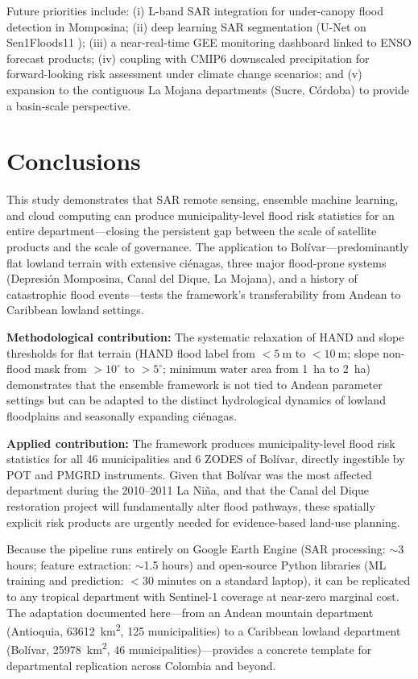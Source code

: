 \documentclass{article}
\begin{document}
Future priorities include: (i) L-band SAR integration for under-canopy flood detection in Momposina; (ii) deep learning SAR segmentation (U-Net on Sen1Floods11 \citep{Bonafilia2020}); (iii) a near-real-time GEE monitoring dashboard linked to ENSO forecast products; (iv) coupling with CMIP6 downscaled precipitation for forward-looking risk assessment under climate change scenarios; and (v) expansion to the contiguous La Mojana departments (Sucre, C\'ordoba) to provide a basin-scale perspective.

\section{Conclusions}
\label{sec:conclusions}

This study demonstrates that SAR remote sensing, ensemble machine learning, and cloud computing can produce municipality-level flood risk statistics for an entire department---closing the persistent gap between the scale of satellite products and the scale of governance. The application to Bol\'ivar---predominantly flat lowland terrain with extensive ci\'enagas, three major flood-prone systems (Depresi\'on Momposina, Canal del Dique, La Mojana), and a history of catastrophic flood events---tests the framework's transferability from Andean to Caribbean lowland settings.

\textbf{Methodological contribution:} The systematic relaxation of HAND and slope thresholds for flat terrain (HAND flood label from $< \SI{5}{\metre}$ to $< \SI{10}{\metre}$; slope non-flood mask from $> 10^{\circ}$ to $> 5^{\circ}$; minimum water area from \SI{1}{\hectare} to \SI{2}{\hectare}) demonstrates that the ensemble framework is not tied to Andean parameter settings but can be adapted to the distinct hydrological dynamics of lowland floodplains and seasonally expanding ci\'enagas.

\textbf{Applied contribution:} The framework produces municipality-level flood risk statistics for all 46 municipalities and 6 ZODES of Bol\'ivar, directly ingestible by POT and PMGRD instruments. Given that Bol\'ivar was the most affected department during the 2010--2011 La Ni\~na, and that the Canal del Dique restoration project will fundamentally alter flood pathways, these spatially explicit risk products are urgently needed for evidence-based land-use planning.

Because the pipeline runs entirely on Google Earth Engine (SAR processing: $\sim$3 hours; feature extraction: $\sim$1.5 hours) and open-source Python libraries (ML training and prediction: $<$30 minutes on a standard laptop), it can be replicated to any tropical department with Sentinel-1 coverage at near-zero marginal cost. The adaptation documented here---from an Andean mountain department (Antioquia, \SI{63612}{\kilo\metre\squared}, 125 municipalities) to a Caribbean lowland department (Bol\'ivar, \SI{25978}{\kilo\metre\squared}, 46 municipalities)---provides a concrete template for departmental replication across Colombia and beyond.
\end{document}
